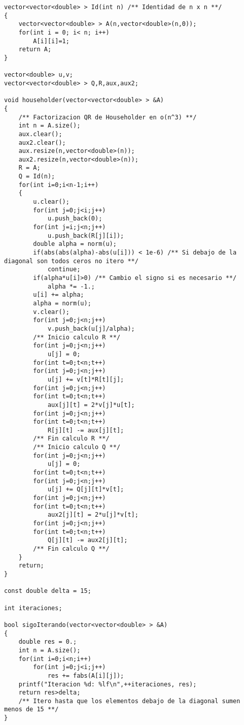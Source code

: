 \begin{lstlisting}
vector<vector<double> > Id(int n) /** Identidad de n x n **/
{
    vector<vector<double> > A(n,vector<double>(n,0));
    for(int i = 0; i< n; i++)
        A[i][i]=1;
    return A;
}

vector<double> u,v;
vector<vector<double> > Q,R,aux,aux2;

void householder(vector<vector<double> > &A)
{
    /** Factorizacion QR de Householder en o(n^3) **/
	int n = A.size();
	aux.clear();
	aux2.clear();
	aux.resize(n,vector<double>(n));
	aux2.resize(n,vector<double>(n));
	R = A;
	Q = Id(n);
	for(int i=0;i<n-1;i++)
	{
	    u.clear();
	    for(int j=0;j<i;j++)
            u.push_back(0);
	    for(int j=i;j<n;j++)
            u.push_back(R[j][i]);
        double alpha = norm(u);
        if(abs(abs(alpha)-abs(u[i])) < 1e-6) /** Si debajo de la diagonal son todos ceros no itero **/
            continue;
        if(alpha*u[i]>0) /** Cambio el signo si es necesario **/
            alpha *= -1.;
        u[i] += alpha;
        alpha = norm(u);
        v.clear();
        for(int j=0;j<n;j++)
            v.push_back(u[j]/alpha);
        /** Inicio calculo R **/
        for(int j=0;j<n;j++)
            u[j] = 0;
        for(int t=0;t<n;t++)
        for(int j=0;j<n;j++)
            u[j] += v[t]*R[t][j];
        for(int j=0;j<n;j++)
        for(int t=0;t<n;t++)
            aux[j][t] = 2*v[j]*u[t];
        for(int j=0;j<n;j++)
        for(int t=0;t<n;t++)
            R[j][t] -= aux[j][t];
        /** Fin calculo R **/
        /** Inicio calculo Q **/
        for(int j=0;j<n;j++)
            u[j] = 0;
        for(int t=0;t<n;t++)
        for(int j=0;j<n;j++)
            u[j] += Q[j][t]*v[t];
        for(int j=0;j<n;j++)
        for(int t=0;t<n;t++)
            aux2[j][t] = 2*u[j]*v[t];
        for(int j=0;j<n;j++)
        for(int t=0;t<n;t++)
            Q[j][t] -= aux2[j][t];
        /** Fin calculo Q **/
	}
	return;
}

const double delta = 15;

int iteraciones;

bool sigoIterando(vector<vector<double> > &A)
{
	double res = 0.;
	int n = A.size();
	for(int i=0;i<n;i++)
	    for(int j=0;j<i;j++)
		    res += fabs(A[i][j]);
    printf("Iteracion %d: %lf\n",++iteraciones, res);
	return res>delta;
	/** Itero hasta que los elementos debajo de la diagonal sumen menos de 15 **/
}


\end{lstlisting}
